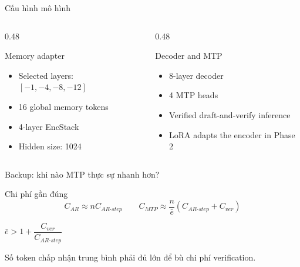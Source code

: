 \documentclass[aspectratio=169,11pt]{beamer}
\begin{document}
\begin{frame}{Cấu hình mô hình}
  \begin{columns}[T,onlytextwidth]
    \begin{column}{0.48\textwidth}
      \begin{block}{Memory adapter}
        \begin{minipage}[t][2.45cm][t]{\linewidth}
        \begin{itemize}
          \item Selected layers: $[-1,-4,-8,-12]$
          \item 16 global memory tokens
          \item 4-layer EncStack
          \item Hidden size: 1024
        \end{itemize}
        \end{minipage}
      \end{block}
    \end{column}
    \hfill
    \begin{column}{0.48\textwidth}
      \begin{exampleblock}{Decoder and MTP}
        \begin{minipage}[t][2.45cm][t]{\linewidth}
        \begin{itemize}
          \item 8-layer decoder
          \item 4 MTP heads
          \item Verified draft-and-verify inference
          \item LoRA adapts the encoder in Phase 2
        \end{itemize}
        \end{minipage}
      \end{exampleblock}
    \end{column}
  \end{columns}
\end{frame}

\begin{frame}{Backup: khi nào MTP thực sự nhanh hơn?}
  \begin{block}{Chi phí gần đúng}
    \[C_{AR}\approx nC_{AR\text{-}step}\qquad C_{MTP}\approx\frac{n}{\bar e}(C_{AR\text{-}step}+C_{ver})\]
  \end{block}
  \vfill
  \begin{center}
    \Large $\bar e > 1 + \dfrac{C_{ver}}{C_{AR\text{-}step}}$
  \end{center}
  \vfill
  \small\alert{Số token chấp nhận trung bình phải đủ lớn để bù chi phí verification.}
\end{frame}
\end{document}
